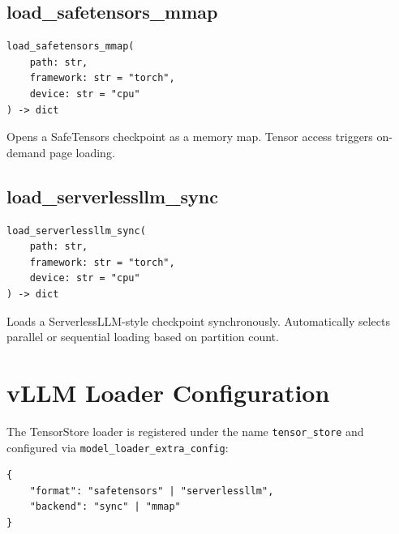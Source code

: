 \subsection{load\_safetensors\_mmap}

\small
\begin{verbatim}
load_safetensors_mmap(
    path: str,
    framework: str = "torch",
    device: str = "cpu"
) -> dict
\end{verbatim}
\normalsize

Opens a SafeTensors checkpoint as a memory map. Tensor access triggers on-demand page loading.

\subsection{load\_serverlessllm\_sync}

\small
\begin{verbatim}
load_serverlessllm_sync(
    path: str,
    framework: str = "torch",
    device: str = "cpu"
) -> dict
\end{verbatim}
\normalsize

Loads a ServerlessLLM-style checkpoint synchronously. Automatically selects parallel or sequential loading based on partition count.

\section{vLLM Loader Configuration}

The TensorStore loader is registered under the name \texttt{tensor\_store} and configured via \texttt{model\_loader\_extra\_config}:

\small
\begin{verbatim}
{
    "format": "safetensors" | "serverlessllm",
    "backend": "sync" | "mmap"
}
\end{verbatim}
\normalsize

